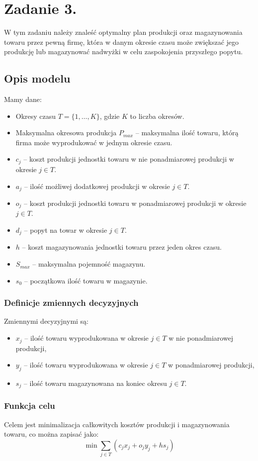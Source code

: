 \documentclass[11pt,a4paper]{article}
\numberwithin{equation}{section}
\begin{document}
\section{Zadanie 3.}
W tym zadaniu należy znaleść optymalny plan produkcji oraz magazynowania towaru przez pewną firmę, która w danym okresie czasu może zwiększać jego produkcję lub magazynować nadwyżki w celu zaspokojenia przyszłego popytu.
\subsection{Opis modelu}
Mamy dane:
\begin{itemize}
    \item Okresy czasu $T = \{1,\dots, K\}$, gdzie $K$ to liczba okresów.
    \item Maksymalna okresowa produkcja $P_{max}$ -- maksymalna ilość towaru, którą firma może wyprodukować w jednym okresie czasu.
    \item $c_j$ -- koszt produkcji jednostki towaru w nie ponadmiarowej produkcji w okresie $j \in T$.
    \item $a_j$ -- ilość możliwej dodatkowej produkcji w okresie $j \in T$.
    \item $o_j$ -- koszt produkcji jednostki towaru w ponadmiarowej produkcji w okresie $j \in T$.
    \item $d_j$ -- popyt na towar w okresie $j \in T$.
    \item $h$ -- koszt magazynowania jednostki towaru przez jeden okres czasu.
    \item $S_{max}$ -- maksymalna pojemność magazynu.
    \item $s_0$ -- początkowa ilość towaru w magazynie.
\end{itemize}

\subsubsection{Definicje zmiennych decyzyjnych}
Zmiennymi decyzyjnymi są:
\begin{itemize}
    \item $x_j$ -- ilość towaru wyprodukowana w okresie $j \in T$ w nie ponadmiarowej produkcji,
    \item $y_j$ -- ilość towaru wyprodukowana w okresie $j \in T$ w ponadmiarowej produkcji,
    \item $s_j$ -- ilość towaru magazynowana na koniec okresu $j \in T$.
\end{itemize}
\subsubsection{Funkcja celu}
Celem jest minimalizacja całkowitych kosztów produkcji i magazynowania towaru, co można zapisać jako:
\[
    \min \sum_{j \in T} \left( c_j x_j + o_j y_j + h s_j \right)
\]
\end{document}
